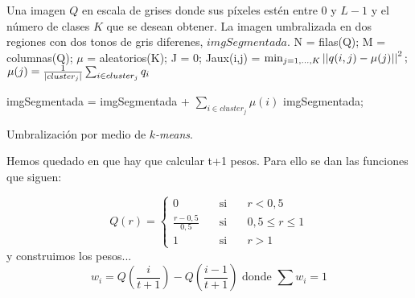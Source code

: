 \begin{algorithm}
\begin{algorithmic}[1]
\REQUIRE Una imagen $Q$ en escala de grises donde sus píxeles estén entre $0$ y $L-1$ y el número de clases $K$ que se desean obtener.
\ENSURE La imagen umbralizada en dos regiones con dos tonos de gris diferenes, $imgSegmentada$.
\STATE N = filas(Q);
\STATE M = columnas(Q);
\STATE $\mu$ = aleatorios(K);
\STATE J = 0;
\REPEAT 
            \STATE Jaux(i,j) = $\min_{j=1,\dots,K} \left\vert\left\vert q(i,j)-\mu(j)\right\vert\right\vert^2;$
        \ENDFOR
    \ENDFOR
        \STATE $\mu(j) = \frac{1}{\left\vert cluster_j\right\vert}\sum_{i\in cluster_j}q_i$  
    \ENDFOR 
{}

    \STATE imgSegmentada = imgSegmentada + $\sum_{i\in cluster_j}\mu(i)$
\ENDFOR
\RETURN imgSegmentada;
\end{algorithmic}
\caption{Umbralización por medio de {\em $k$-means}.}\label{alg:kmeans}
\end{algorithm}


%
% 





Hemos quedado en que hay que calcular t+1 pesos. Para ello se dan las funciones que siguen:

\begin{equation}
Q(r) = \left\{\begin{aligned}
    0 & \quad\text{si} \quad& r<0,5\\
    \frac{r-0,5}{0,5} & \quad\text{si} & 0,5\leq r \leq 1\\
    1 & \quad\text{si}\quad & r > 1
\end{aligned}\right.
\end{equation}
y construimos los pesos...
$$w_i=Q\left(\frac{i}{t+1}\right) - Q\left(\frac{i-1}{t+1}\right)
\text{ donde }\sum w_i=1$$

